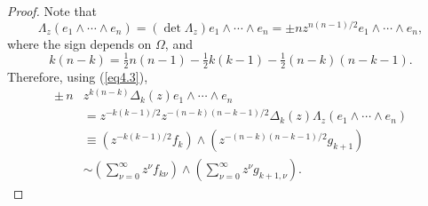 \documentclass{surv-l}
\theoremstyle{plain}
\theoremstyle{definition}
\numberwithin{equation}{chapter}
\begin{document}
\begin{proof}
Note that
\begin{equation*}
\Lambda_{z}(e_{1}\wedge\cdots\wedge e_{n})=(\det\Lambda_{z})e_{1}\wedge\cdots\wedge e_{n}=\pm nz^{n(n-1)/2}e_{1}\wedge\cdots\wedge e_{n},
\end{equation*}
where the sign depends on $\Omega$, and
\begin{equation*}
k(n-k)=\tfrac{1}{2}n(n-1)-\tfrac{1}{2}k(k-1)-\tfrac{1}{2}(n-k)(n-k-1).
\end{equation*}
Therefore, using (\ref{eq4.3}),
\begin{align*}
\pm\, n&z^{k(n-k)}\Delta_{k}(z)e_{1}\wedge\cdots\wedge e_{n}\\
&=z^{-k(k-1)/2}z^{-(n-k)(n-k-1)/2}\Delta_{k}(z)\Lambda_{z}(e_{1}\wedge\cdots \wedge e_{n})\\
&\equiv(z^{-k(k-1)/2}f_{k})\wedge(z^{-(n-k)(n-k-1)/2}g_{k+1})\\
&\sim\left(\sum_{\nu=0}^{\infty}z^{\nu}f_{k\nu}\right)\wedge\left(\sum_{\nu=0}^{\infty}z^{\nu}g_{k+1,\nu}\right).
\end{align*}
\end{proof}
\end{document}
